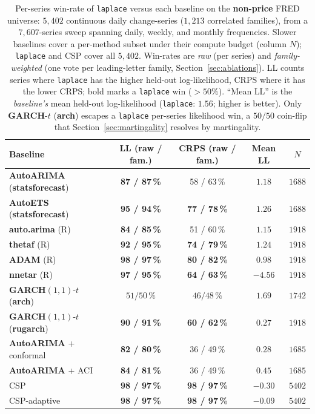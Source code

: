 \documentclass[article]{jss}
\providecommand{\proglang}[1]{\textsf{#1}}
\providecommand{\pkg}[1]{\textbf{#1}}
\providecommand{\code}[1]{\texttt{#1}}
\begin{document}
\begin{table}[t!]
\centering
\begin{tabular}{lcccc}
\toprule
Baseline & LL (raw / fam.) & CRPS (raw / fam.) & Mean LL & $N$ \\
\midrule
\pkg{AutoARIMA} (\pkg{statsforecast})  & \textbf{87 / 87\,\%} & 58 / 63\,\% & $1.18$ & $1688$ \\
\pkg{AutoETS} (\pkg{statsforecast})    & \textbf{95 / 94\,\%} & \textbf{77 / 78\,\%} & $1.26$ & $1688$ \\
\pkg{auto.arima} (\proglang{R})        & \textbf{84 / 85\,\%} & 51 / 60\,\% & $1.15$ & $1918$ \\
\pkg{thetaf} (\proglang{R})            & \textbf{92 / 95\,\%} & \textbf{74 / 79\,\%} & $1.24$ & $1918$ \\
\pkg{ADAM} (\proglang{R})              & \textbf{98 / 97\,\%} & \textbf{80 / 82\,\%} & $0.98$ & $1918$ \\
\pkg{nnetar} (\proglang{R})            & \textbf{97 / 95\,\%} & \textbf{64 / 63\,\%} & $-4.56$ & $1918$ \\
\pkg{GARCH}$(1,1)$-$t$ (\pkg{arch})    & $51 / 50\,\%$ & $46 / 48\,\%$ & $1.69$ & $1742$ \\
\pkg{GARCH}$(1,1)$-$t$ (\pkg{rugarch}) & \textbf{90 / 91\,\%} & \textbf{60 / 62\,\%} & $0.27$ & $1918$ \\
\pkg{AutoARIMA} + conformal            & \textbf{82 / 80\,\%} & 36 / 49\,\% & $0.28$ & $1685$ \\
\pkg{AutoARIMA} + ACI                  & \textbf{84 / 81\,\%} & 36 / 49\,\% & $0.45$ & $1685$ \\
CSP                                    & \textbf{98 / 97\,\%} & \textbf{98 / 97\,\%} & $-0.30$ & $5402$ \\
CSP-adaptive                           & \textbf{98 / 97\,\%} & \textbf{98 / 97\,\%} & $-0.09$ & $5402$ \\
\bottomrule
\end{tabular}
\caption{Per-series win-rate of \code{laplace} versus each baseline on the
\textbf{non-price} \proglang{FRED} universe: $5{,}402$ continuous daily
change-series ($1{,}213$ correlated families), from a $7{,}607$-series sweep
spanning daily, weekly, and monthly frequencies. Slower baselines cover a
per-method subset under their compute budget (column $N$); \code{laplace} and CSP
cover all $5{,}402$. Win-rates are \emph{raw} (per series) and
\emph{family-weighted} (one vote per leading-letter family,
Section~\ref{sec:ablations}). LL counts series where \code{laplace} has the higher
held-out log-likelihood, CRPS where it has the lower CRPS; bold marks a
\code{laplace} win ($>50\%$). ``Mean LL'' is the \emph{baseline's} mean held-out
log-likelihood (\code{laplace}: $\mathbf{1.56}$; higher is better). Only
\pkg{GARCH}-$t$ (\pkg{arch}) escapes a \code{laplace} per-series likelihood win,
a $50/50$ coin-flip that Section~\ref{sec:martingality} resolves by
martingality.}
\label{tab:sota}
\end{table}
\end{document}
